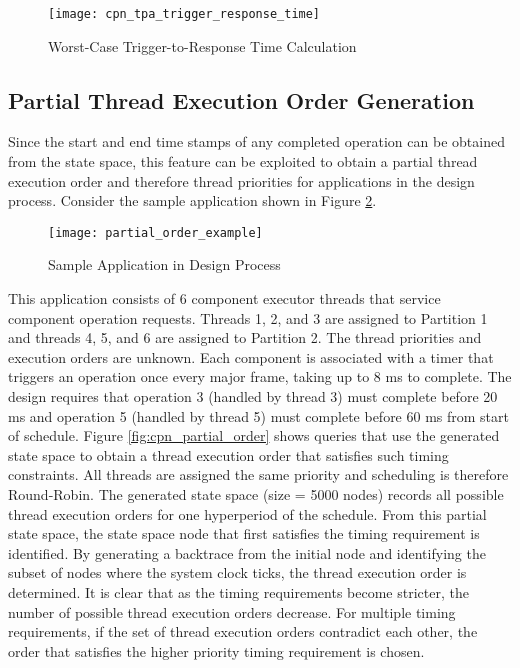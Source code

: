 \begin{figure}[ht]
\centering
\texttt{[image: cpn\_tpa\_trigger\_response\_time]}
\caption{Worst-Case Trigger-to-Response Time Calculation}
\label{fig:cpn_tpa_trigger_response_time}
\vspace{-0.2in}
\end{figure}
\vspace{0.1in}

\subsection{Partial Thread Execution Order Generation}

Since the start and end time stamps of any completed operation can be obtained from the state space, this feature can be exploited to obtain a partial thread execution order and therefore thread priorities for applications in the design process. Consider the sample application shown in Figure \ref{fig:partial_order_example}.

\vspace{-0.08in}
\begin{figure}[ht]
\centering
\texttt{[image: partial\_order\_example]}
\caption{Sample Application in Design Process}
\label{fig:partial_order_example}
\vspace{-0.16in}
\end{figure}

This application consists of 6 component executor threads that service component operation requests. Threads 1, 2, and 3 are assigned to Partition 1 and threads 4, 5, and 6 are assigned to Partition 2. The thread priorities and execution orders are unknown. Each component is associated with a timer that triggers an operation once every major frame, taking up to 8 ms to complete. The design requires that operation 3 (handled by thread 3) must complete before 20 ms and operation 5 (handled by thread 5) must complete before 60 ms from start of schedule. Figure \ref{fig:cpn_partial_order} shows queries that use the generated state space to obtain a thread execution order that satisfies such timing constraints. All threads are assigned the same priority and scheduling is therefore Round-Robin. The generated state space (size = 5000 nodes) records all possible thread execution orders for one hyperperiod of the schedule. From this partial state space, the state space node that first satisfies the timing requirement is identified. By generating a backtrace from the initial node and identifying the subset of nodes where the system clock ticks, the thread execution order is determined. It is clear that as the timing requirements become stricter, the number of possible thread execution orders decrease. For multiple timing requirements, if the set of thread execution orders contradict each other, the order that satisfies the higher priority timing requirement is chosen.

